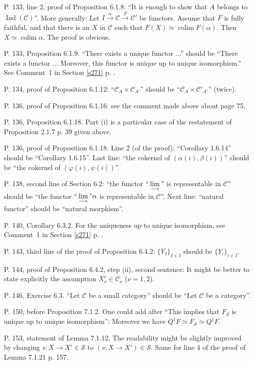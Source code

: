 \documentclass[12pt]{article}
\theoremstyle{remark}
\newcommand{\n}{\noindent}
\newcommand{\C}{\mathcal C}
\newcommand{\SSS}{\mathcal S}
\newcommand{\p}{\varphi}
\DeclareMathOperator*{\coli}{colim}
\DeclareMathOperator{\Ind}{Ind}
\begin{document}
\n P. 133, line 2, proof of Proposition 6.1.8: ``It is enough to show that $A$ belongs to $\Ind(\C)$''. More generally: Let $I\xrightarrow{\alpha}\C\xrightarrow{F}\C'$ be functors. Assume that $F$ is fully faithful, and that there is an $X$ in $\C$ such that $F(X)\simeq\coli F(\alpha)$. Then $X\simeq\coli\alpha$. The proof is obvious. 

\n P. 133, Proposition 6.1.9. ``There exists a unique functor ...'' should be ``There exists a functor ... Moreover, this functor is unique up to unique isomorphism.'' See Comment~1 in Section \ref{s271} p. \pageref{s271}. 

\n P. 134, proof of Proposition 6.1.12: ``$\C_A\times\C_{A'}$'' should be ``$\C_A\times\C'_{A'}$'' (twice). 

\n P. 136, proof of Proposition 6.1.16: see the comment made above about page 75. 

\n P. 136, Proposition 6.1.18. Part (i) is a particular case of the restatement of Proposition 2.1.7 p. 39 given above. 

\n P. 136, proof of Proposition 6.1.18. Line 2 (of the proof): ``Corollary 1.6.14'' should be ``Corollary 1.6.15''. Last line: ``the cokernel of $(\alpha(i),\beta(i))$'' should be ``the cokernel of $(\p(i),\psi(i))$''. 

\n P. 138, second line of Section 6.2: ``the functor $``\displaystyle\lim_{\longrightarrow}"$ is representable in $\C$'' should be ``the functor $``\displaystyle\lim_{\longrightarrow}"\alpha$ is representable in $\C$''. Next line: ``natural functor'' should be ``natural morphism''. 

\n P. 140, Corollary 6.3.2. For the uniqueness up to unique isomorphism, see Comment~1 in Section \ref{s271} p. \pageref{s271}. 

\n P. 143, third line of the proof of Proposition 6.4.2: $\{Y_I\}_{I\in I}$ should be $\{Y_i\}_{i\in I}$. 

\n P. 144, proof of Proposition 6.4.2, step (ii), second sentence: It might be better to state explicitly the assumption $X_\nu^i\in\C_\nu$ ($\nu=1,2$). 

\n P. 146, Exercise 6.3. ``Let $\C$ be a small category'' should be ``Let $\C$ be a category''. 

\n P. 150, before Proposition 7.1.2. One could add after ``This implies that $F_{\SSS}$ is unique up to unique isomorphism'': Moreover we have $Q^\dagger F\simeq F_{\SSS}\simeq Q^\ddagger F$. 

\n P. 153, statement of Lemma 7.1.12. The readability might be slightly improved by changing $s:X\to X'\in\mathcal S$ to $(s:X\to X')\in\mathcal S$. Same for line 4 of the proof of Lemma 7.1.21 p. 157.  
\end{document}
